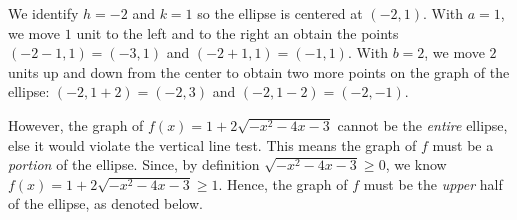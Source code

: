 \documentclass{ximera}
\begin{document}
\begin{example}
\begin{enumerate}
 We identify $h=-2$ and $k=1$ so the ellipse is centered at $(-2,1)$.  With $a=1$, we move $1$ unit to the left and to the right an obtain the points $(-2-1,1) = (-3,1)$ and $(-2+1, 1) = (-1,1)$.  With $b=2$, we move $2$ units up and down from the center to obtain two more points on the graph of the ellipse: $(-2, 1+2) = (-2,3)$ and $(-2, 1-2) = (-2,-1)$. 
 
  
 
However, the graph of $f(x) = 1 + 2\sqrt{-x^2-4x-3}$  cannot be the \textit{entire} ellipse, else it would violate the vertical line test.  This means the graph of $f$ must be a \textit{portion} of the ellipse.  Since, by definition $\sqrt{-x^2-4x-3} \geq 0$, we know $f(x) =  1 + 2\sqrt{-x^2-4x-3} \geq 1$.  Hence, the graph of  $f$ must be the \textit{upper} half of the ellipse, as denoted below.

\begin{image}

\end{image}


\end{enumerate}
\end{example}
\end{document}
